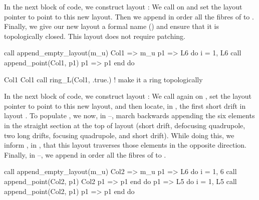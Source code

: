 %
In the next block of code, we construct layout : We
call  on  and set the layout
pointer  to point to this new layout. Then we append
in order all the fibres of  to . Finally, we
give our new layout a formal name () and ensure
that it is topologically closed. This layout does not require
patching.
%
\begin{ptccode}
call append_empty_layout(m_u)
Col1 => m_u%
p1 => L6%
do i = 1, L6%
  call append_point(Col1, p1)
  p1 => p1%
end do

Col1%
Col1%
call ring_L(Col1, .true.) ! make it a ring topologically
\end{ptccode}

In the next block of code, we construct layout : We call
 again on , set the layout
pointer  to point to this new layout, and then locate,
in , the first short drift in layout .
To populate , we now, in
--, march backwards
appending the six elements in the straight section at the top of
layout  (short drift, defocusing quadrupole, two long drifts,
focusing quadrupole, and short drift). While doing this, we inform
\PTC, in , that this layout traverses those
elements in the opposite direction. Finally, in
--, we append in order all
the fibres of  to .
%
\begin{ptccode}
call append_empty_layout(m_u)
Col2 => m_u%
p1 => L6%
do i = 1, 6                 \label{lin:col2.bapp.str}
  call append_point(Col2, p1)
  Col2%
  p1 => p1%
end do                      \label{lin:col2.eapp.str}
p1 => L5%
do i = 1, L5%
  call append_point(Col2, p1)
  p1 => p1%
end do                      \label{lin:col2.eapp.L5}
\end{ptccode}

